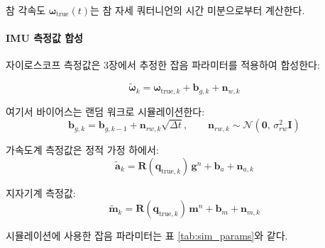                 참 각속도 $\boldsymbol{\omega}_{\text{true}}(t)$는 참 자세 쿼터니언의 시간 미분으로부터 계산한다.

            \paragraph{IMU 측정값 합성}
                자이로스코프 측정값은 3장에서 추정한 잡음 파라미터를 적용하여 합성한다:

                \begin{equation}
                    \tilde{\boldsymbol{\omega}}_k = \boldsymbol{\omega}_{\text{true},k} + \mathbf{b}_{g,k} + \mathbf{n}_{w,k}
                    \label{eq:sim_gyro}
                \end{equation}
                
                \noindent 여기서 바이어스는 랜덤 워크로 시뮬레이션한다:\\
                
                \begin{equation}
                    \mathbf{b}_{g,k} = \mathbf{b}_{g,k-1} + \mathbf{n}_{rw,k}\sqrt{\Delta t}, \qquad \mathbf{n}_{rw,k} \sim \mathcal{N}(\mathbf{0},\, \sigma_{rw}^2\mathbf{I})
                    \label{eq:sim_bias}
                \end{equation}
                
                가속도계 측정값은 정적 가정 하에서:\\
                
                \begin{equation}
                    \tilde{\mathbf{a}}_k = \mathbf{R}(\mathbf{q}_{\text{true},k})\,\mathbf{g}^n + \mathbf{b}_{a} + \mathbf{n}_{a,k}
                    \label{eq:sim_accel}
                \end{equation}
                
                지자기계 측정값:\\
                
                \begin{equation}
                    \tilde{\mathbf{m}}_k = \mathbf{R}(\mathbf{q}_{\text{true},k})\,\mathbf{m}^n + \mathbf{b}_{m} + \mathbf{n}_{m,k}
                    \label{eq:sim_mag}
                \end{equation}
                
                시뮬레이션에 사용한 잡음 파라미터는 표 \ref{tab:sim_params}와 같다.\\
                
